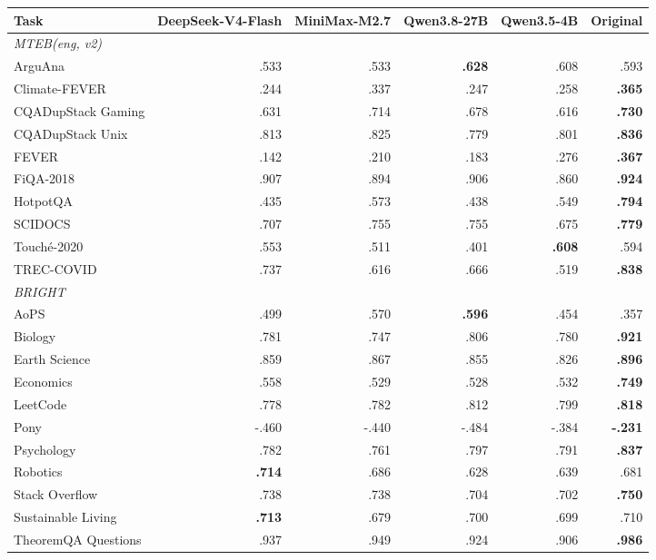 \begin{table}[t]
\centering\small
\setlength{\tabcolsep}{4pt}
\begin{tabular}{lrrrrr}
\toprule
\textbf{Task} & \textbf{DeepSeek-V4-Flash} & \textbf{MiniMax-M2.7} & \textbf{Qwen3.8-27B} & \textbf{Qwen3.5-4B} & \textbf{Original} \\
\midrule
\multicolumn{6}{l}{\textit{MTEB(eng, v2)}} \\
ArguAna & .533 & .533 & \textbf{.628} & .608 & .593 \\
Climate-FEVER & .244 & .337 & .247 & .258 & \textbf{.365} \\
CQADupStack Gaming & .631 & .714 & .678 & .616 & \textbf{.730} \\
CQADupStack Unix & .813 & .825 & .779 & .801 & \textbf{.836} \\
FEVER & .142 & .210 & .183 & .276 & \textbf{.367} \\
FiQA-2018 & .907 & .894 & .906 & .860 & \textbf{.924} \\
HotpotQA & .435 & .573 & .438 & .549 & \textbf{.794} \\
SCIDOCS & .707 & .755 & .755 & .675 & \textbf{.779} \\
Touché-2020 & .553 & .511 & .401 & \textbf{.608} & .594 \\
TREC-COVID & .737 & .616 & .666 & .519 & \textbf{.838} \\
\midrule
\multicolumn{6}{l}{\textit{BRIGHT}} \\
AoPS & .499 & .570 & \textbf{.596} & .454 & .357 \\
Biology & .781 & .747 & .806 & .780 & \textbf{.921} \\
Earth Science & .859 & .867 & .855 & .826 & \textbf{.896} \\
Economics & .558 & .529 & .528 & .532 & \textbf{.749} \\
LeetCode & .778 & .782 & .812 & .799 & \textbf{.818} \\
Pony & -.460 & -.440 & -.484 & -.384 & \textbf{-.231} \\
Psychology & .782 & .761 & .797 & .791 & \textbf{.837} \\
Robotics & \textbf{.714} & .686 & .628 & .639 & .681 \\
Stack Overflow & .738 & .738 & .704 & .702 & \textbf{.750} \\
Sustainable Living & \textbf{.713} & .679 & .700 & .699 & .710 \\
TheoremQA Questions & .937 & .949 & .924 & .906 & \textbf{.986} \\

\end{tabular}
\end{table}
